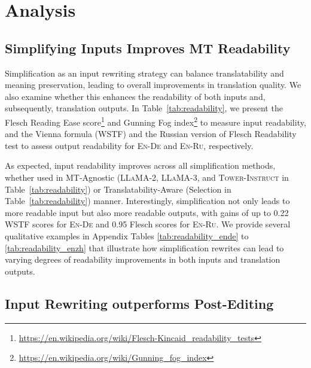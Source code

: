 \section{Analysis}
\label{5 analysis}

\subsection{Simplifying Inputs Improves MT Readability}
\label{readability}

Simplification as an input rewriting strategy can balance translatability and meaning preservation, leading to overall improvements in translation quality. We also examine whether this enhances the readability of both inputs and, subsequently, translation outputs. In Table~\ref{tab:readability}, we present the Flesch Reading Ease score\footnote{\url{https://en.wikipedia.org/wiki/Flesch-Kincaid_readability_tests}} and Gunning Fog index\footnote{\url{https://en.wikipedia.org/wiki/Gunning_fog_index}} to measure input readability, and the Vienna formula (WSTF) \citep{zowalla2023readability} and the Russian version of Flesch Readability test \citep{inbook} to assess output readability for \textsc{En-De} and \textsc{En-Ru}, respectively.

As expected, input readability improves across all simplification methods, whether used in MT-Agnostic (\textsc{LLaMA-2}, \textsc{LLaMA-3}, and \textsc{Tower-Instruct} in Table~\ref{tab:readability}) or Translatability-Aware (Selection in Table~\ref{tab:readability}) manner. Interestingly, simplification not only leads to more readable input but also more readable outputs, with gains of up to 0.22 WSTF scores for \textsc{En-De} and 0.95 Flesch scores for \textsc{En-Ru}. We provide several qualitative examples in Appendix Tables \ref{tab:readability_ende} to \ref{tab:readability_enzh} that illustrate how simplification rewrites can lead to varying degrees of readability improvements in both inputs and translation outputs.









\subsection{Input Rewriting outperforms Post-Editing}
\label{res:post-editing}

